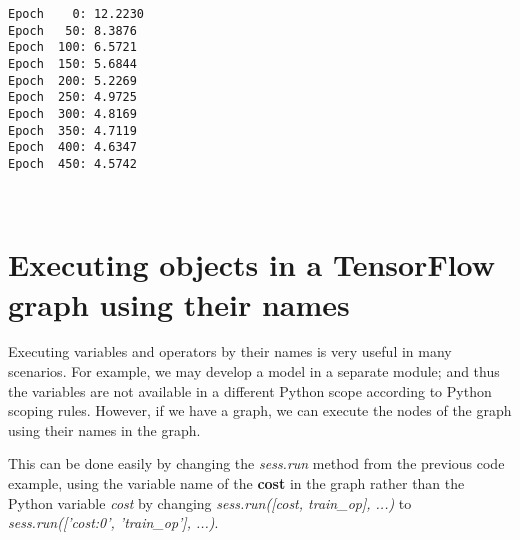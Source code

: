 \documentclass[11pt]{article}
\begin{document}
    \begin{Verbatim}[commandchars=\\\{\}]
Epoch    0: 12.2230
Epoch   50: 8.3876
Epoch  100: 6.5721
Epoch  150: 5.6844
Epoch  200: 5.2269
Epoch  250: 4.9725
Epoch  300: 4.8169
Epoch  350: 4.7119
Epoch  400: 4.6347
Epoch  450: 4.5742

    \end{Verbatim}

    \begin{center}
    \end{center}
    { \hspace*{\fill} \\}
    
    \section{Executing objects in a TensorFlow graph using their
names}\label{executing-objects-in-a-tensorflow-graph-using-their-names}

    Executing variables and operators by their names is very useful in many
scenarios. For example, we may develop a model in a separate module; and
thus the variables are not available in a different Python scope
according to Python scoping rules. However, if we have a graph, we can
execute the nodes of the graph using their names in the graph.

This can be done easily by changing the \emph{sess.run} method from the
previous code example, using the variable name of the \textbf{cost} in
the graph rather than the Python variable \emph{cost} by changing
\emph{sess.run({[}cost, train\_op{]}, ...)} to
\emph{sess.run({[}'cost:0', 'train\_op'{]}, ...)}.
\end{document}
